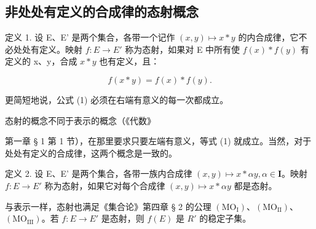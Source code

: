 \subsection{非处处有定义的合成律的态射概念}

定义 1. 设 E、E' 是两个集合，各带一个记作 \((x,y)\mapsto x*y\) 的内合成律，它不必处处有定义。映射 \(f:E\to E'\) 称为态射，如果对 E 中所有使 \(f(x)*f(y)\) 有定义的 x、y，合成 \(x*y\) 也有定义，且：

\[
f (x * y) = f (x) * f (y).\tag{1}
\]

更简短地说，公式 (1) 必须在右端有意义的每一次都成立。

态射的概念不同于表示的概念（《代数》

第一章 § 1 第 1 节），在那里要求只要左端有意义，等式 (1) 就成立。当然，对于处处有定义的合成律，这两个概念是一致的。

定义 2. 设 E、E' 是两个集合，各带一族内合成律 \((x,y)\mapsto x*\alpha y,\alpha\in\mathbf{I}\)。映射 \(f:E\to E'\) 称为态射，如果它对每个合成律 \((x,y)\mapsto x*\alpha y\) 都是态射。

与表示一样，态射也满足《集合论》第四章 § 2 的公理 \((\mathrm{MO}_{\mathrm{I}})\)、\((\mathrm{MO}_{\mathrm{II}})\)、\((\mathrm{MO}_{\mathrm{III}})\)。若 \(f: E \to E'\) 是态射，则 \(f(E)\) 是 \(R'\) 的稳定子集。

